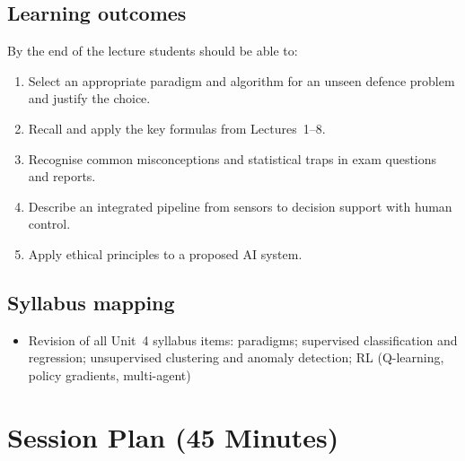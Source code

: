 \documentclass[11pt]{article}
\begin{document}
\subsection*{Learning outcomes}By the end of the lecture students should be able to:\begin{enumerate}\item Select an appropriate paradigm and algorithm for an unseen defence problem and justify the choice.\item Recall and apply the key formulas from Lectures~1--8.\item Recognise common misconceptions and statistical traps in exam questions and reports.\item Describe an integrated pipeline from sensors to decision support with human control.\item Apply ethical principles to a proposed AI system.\end{enumerate}

\subsection*{Syllabus mapping}\begin{itemize}\item Revision of all Unit~4 syllabus items: paradigms; supervised classification and regression; unsupervised clustering and anomaly detection; RL (Q-learning, policy gradients, multi-agent)\end{itemize}

\section{Session Plan (45 Minutes)}
\end{document}
